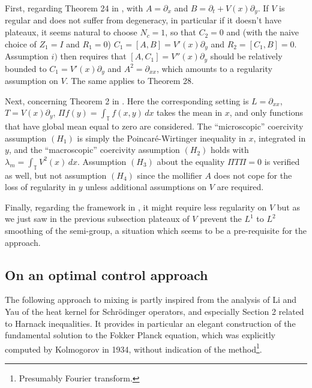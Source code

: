 \documentclass[12pt]{article}
\newcommand{\T}{\mathbb{T}}
\begin{document}
First, regarding Theorem 24 in \cite{Vil09}, with $A = \partial_x$ and 
$B = \partial_t + V(x)\partial_y$. If $V$ is regular and does not suffer from 
degeneracy, in particular if it doesn't have plateaux, it seems natural to 
choose $N_c = 1$, so that $C_2 = 0$ and (with the naive choice of $Z_1 = I$ and 
$R_1 = 0$) $C_1 = [A,B] = V'(x)\partial_y$ and $R_2 = [C_1, B] = 0$.  
Assumption $i)$ then requires that $[A, C_1] = V''(x)\partial_y$ should be 
relatively bounded to $C_1 = V'(x)\partial_y$ and $A^2 = \partial_{xx}$, which 
amounts to a regularity assumption on $V$. The same applies to Theorem 28.

Next, concerning Theorem 2 in \cite{DolMouSch15}. Here the corresponding setting 
is $L = \partial_{xx}$, $T = V(x)\partial_y$, $\Pi f(y) = \int_{\T}f(x,y)\, dx$ 
takes the mean in $x$, and only functions that have global mean equal to zero 
are considered. The ``microscopic'' coercivity assumption $(H_1)$ is simply 
the Poincaré-Wirtinger inequality in $x$, integrated in $y$, and the ``macroscopic'' 
coercivity assumption $(H_2)$ holds with $\lambda_m = \int_\T V^2(x)\, dx.$ 
Assumption $(H_3)$ about the equality $\Pi T \Pi = 0$ is verified as well, 
but not assumption $(H_4)$ since the mollifier $A$ does not cope for the 
loss of regularity in $y$ unless additional assumptions on $V$ are required.

Finally, regarding the framework in \cite{GuaMisMou17}, it might require less 
regularity on $V$ but as we just saw in the previous subsection plateaux of 
$V$ prevent the $L^1$ to $L^2$ smoothing of the semi-group, a situation 
which seems to be a pre-requisite for the approach.

\subsection{On an optimal control approach}\label{sect:hj}
The following approach to mixing is partly inspired from the analysis of Li and
Yau \cite{LiYau86} of the heat kernel for Schr\"odinger operators, and especially
Section 2 related to Harnack inequalities. It provides in particular an elegant 
construction of the fundamental solution to the Fokker Planck equation, which
was explicitly computed by Kolmogorov \cite{Kol34} in 1934, without
indication of the method\footnote{Presumably Fourier transform.}. 

\medskip
\end{document}
